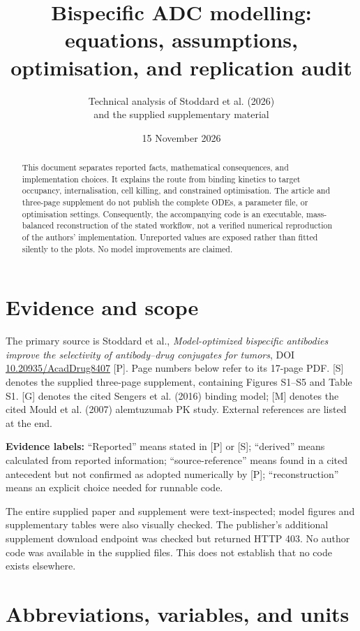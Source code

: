 \documentclass[11pt,a4paper]{article}
\title{Bispecific ADC modelling:\\equations, assumptions, optimisation, and replication audit}
\author{Technical analysis of Stoddard et al. (2026)\\and the supplied supplementary material}
\date{15 November 2026}
\begin{document}
\maketitle
\begin{abstract}
This document separates reported facts, mathematical consequences, and implementation choices. It explains the route from binding kinetics to target occupancy, internalisation, cell killing, and constrained optimisation. The article and three-page supplement do not publish the complete ODEs, a parameter file, or optimisation settings. Consequently, the accompanying code is an executable, mass-balanced reconstruction of the stated workflow, not a verified numerical reproduction of the authors' implementation. Unreported values are exposed rather than fitted silently to the plots. No model improvements are claimed.
\end{abstract}
\tableofcontents\newpage

\section{Evidence and scope}
The primary source is Stoddard et al., \emph{Model-optimized bispecific antibodies improve the selectivity of antibody--drug conjugates for tumors}, DOI \href{https://doi.org/10.20935/AcadDrug8407}{10.20935/AcadDrug8407} [P]. Page numbers below refer to its 17-page PDF. [S] denotes the supplied three-page supplement, containing Figures S1--S5 and Table S1. [G] denotes the cited Sengers et al. (2016) binding model; [M] denotes the cited Mould et al. (2007) alemtuzumab PK study. External references are listed at the end.

\textbf{Evidence labels:} ``Reported'' means stated in [P] or [S]; ``derived'' means calculated from reported information; ``source-reference'' means found in a cited antecedent but not confirmed as adopted numerically by [P]; ``reconstruction'' means an explicit choice needed for runnable code.

The entire supplied paper and supplement were text-inspected; model figures and supplementary tables were also visually checked. The publisher's additional supplement download endpoint was checked but returned HTTP 403. No author code was available in the supplied files. This does not establish that no code exists elsewhere.

\section{Abbreviations, variables, and units}
\end{document}
